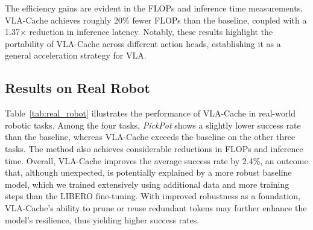 The efficiency gains are evident in the FLOPs and inference time measurements. VLA-Cache achieves roughly 20\% fewer FLOPs than the baseline, coupled with a 1.37× reduction in inference latency. Notably, these results highlight the portability of VLA-Cache across different action heads, establishing it as a general acceleration strategy for VLA. 

\subsection{Results on Real Robot}
Table~\ref{tab:real_robot} illustrates the performance of VLA-Cache in real-world robotic tasks. Among the four tasks, \emph{PickPot} shows a slightly lower success rate than the baseline, whereas VLA-Cache exceeds the baseline on the other three tasks. The method also achieves considerable reductions in FLOPs and inference time. Overall, VLA-Cache improves the average success rate by 2.4\%, an outcome that, although unexpected, is potentially explained by a more robust baseline model, which we trained extensively using additional data and more training steps than the LIBERO fine-tuning. With improved robustness as a foundation, VLA-Cache’s ability to prune or reuse redundant tokens may further enhance the model’s resilience, thus yielding higher success rates.


